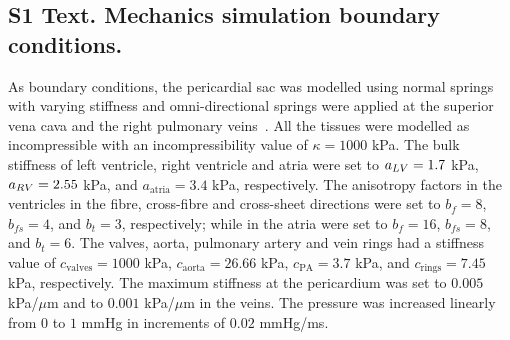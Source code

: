 \subsection*{S1 Text. Mechanics simulation boundary conditions.}

As boundary conditions, the pericardial sac was modelled using normal springs
with varying stiffness and omni-directional springs were applied at the
superior vena cava and the right pulmonary veins~\cite{strocchi2023_cell}.
All the tissues were modelled as incompressible with an incompressibility
value of $\kappa=1000$ kPa.
The bulk stiffness of left ventricle, right ventricle and atria were set to
$a_{LV}=1.7$ kPa,
$a_{RV}=2.55$ kPa, and
$a_{\text{atria}}=3.4$ kPa, respectively.
The anisotropy factors in the ventricles in the fibre, cross-fibre and
cross-sheet directions were set to
$b_f=8$,
$b_{fs}=4$, and
$b_t=3$, respectively;
while in the atria were set to
$b_f=16$,
$b_{fs}=8$, and
$b_t=6$.
The valves, aorta, pulmonary artery and vein rings had a stiffness value of
$c_{\text{valves}}=1000$ kPa,
$c_{\text{aorta}}=26.66$ kPa,
$c_{\text{PA}}=3.7$ kPa, and
$c_{\text{rings}}=7.45$ kPa, respectively.
The maximum stiffness at the pericardium was set to $0.005$ kPa/$\mu$m and
to $0.001$ kPa/$\mu$m in the veins.
The pressure was increased linearly from $0$ to $1$ mmHg in increments of
$0.02$ mmHg/ms.
